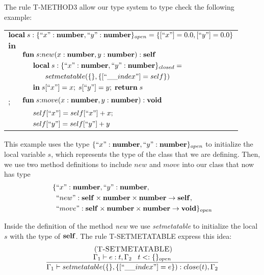 The rule \textsc{T-METHOD3} allow our type system to type check the
following example:
\begin{center}
\begin{tabular}{llll}
\multicolumn{4}{l}{$\mathbf{local} \; s:\{``x":\mathbf{number}, ``y":\mathbf{number}\}_{open} = \{ [``x"] = 0.0, [``y"] = 0.0 \}$}\\
\multicolumn{4}{l}{$\mathbf{in}$}\\
& \multicolumn{3}{l}{$\mathbf{fun} \; s{:}new (x:\mathbf{number}, y:\mathbf{number}):\mathbf{self}$}\\
& & \multicolumn{2}{l}{$\mathbf{local} \; s:\{``x":\mathbf{number}, ``y":\mathbf{number}\}_{closed} =$}\\
& & & \multicolumn{1}{l}{$setmetatable(\{\}, \{ [``\string_\string_index"] = self \})$}\\
& & \multicolumn{2}{l}{$\mathbf{in} \; s[``x"] = x; \; s[``y"] = y; \; \mathbf{return} \; s$}\\
; & \multicolumn{3}{l}{$\mathbf{fun} \; s{:}move (x:\mathbf{number}, y:\mathbf{number}):\mathbf{void}$}\\
& & \multicolumn{2}{l}{$self[``x"] = self[``x"] + x;$}\\
& & \multicolumn{2}{l}{$self[``y"] = self[``y"] + y$}
\end{tabular}
\end{center}

This example uses the type $\{``x":\mathbf{number}, ``y":\mathbf{number}\}_{open}$ to
initialize the local variable $s$, which represents the type of the class
that we are defining.
Then, we use two method definitions to include $new$ and $move$ into
our class that now has type
\begin{align*}
\{ & ``x":\mathbf{number}, ``y":\mathbf{number},\\
   & ``new":\mathbf{self} \times \mathbf{number} \times \mathbf{number} \rightarrow \mathbf{self},\\
   & ``move":\mathbf{self} \times \mathbf{number} \times \mathbf{number} \rightarrow \mathbf{void} \}_{open}
\end{align*}

Inside the definition of the method \emph{new} we use \emph{setmetatable}
to initialize the local $s$ with the type of $\mathbf{self}$.
The rule \textsc{T-SETMETATABLE} express this idea:
\[
\begin{array}{c}
\mylabel{T-SETMETATABLE}\\
\dfrac{\env_{1} \vdash e:t, \env_{2} \;\;\;
       t \subtype \{\}_{open}}
      {\env_{1} \vdash setmetatable(\{\}, \{[``\string_\string_index"] = e\}):close(t), \env_{2}}
\end{array}
\]

